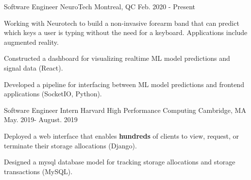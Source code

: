\begin{cventries}
  \cventry
    {Software Engineer} %
    {NeuroTech} %
    {Montreal, QC} %
    {Feb. 2020 - Present} %
    {
      \begin{cvitems} %
      \item {Working with Neurotech to build a non-invasive forearm band that can predict which keys a user is typing without the need for a keyboard. Applications include augmented reality.}
      \item {Constructed a dashboard for visualizing realtime ML model predictions and signal data (React).}
      \item {Developed a pipeline for interfacing between ML model predictions and frontend applications (SocketIO, Python).}
      \end{cvitems}
    }


  \cventry
    {Software Engineer Intern} %
    {Harvard High Performance Computing} %
    {Cambridge, MA} %
    {May. 2019- August. 2019} %
    {
      \begin{cvitems} %
      \item {Deployed a web interface that enables \textbf{hundreds} of clients to view, request, or terminate their storage allocations (Django).}
      \item {Designed a mysql database model for tracking storage allocations and storage transactions (MySQL).}
      \end{cvitems}
    }


\end{cventries}
